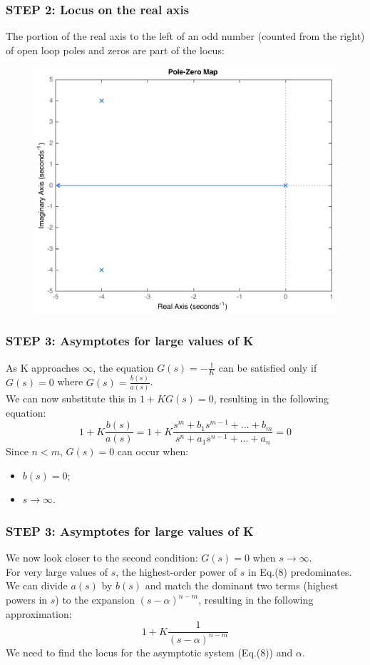 \begin{frame}
\frametitle{STEP 2: Locus on the real axis}
	The portion of the real axis to the left of an odd number (counted from the right) of open loop poles and zeros are part of the locus:
	\begin{exampleblock}{}
		\begin{figure}
			\centering
			\includegraphics[width=0.6\linewidth]{how_to_draw_ex2}
		\end{figure}
	\end{exampleblock}
\end{frame}

\begin{frame}
\frametitle{STEP 3: Asymptotes for large values of K}
\justify
	As K approaches $\infty$, the equation $G(s) = -\frac{1}{K}$ can be satisfied only if $G(s) = 0$ where $G(s) = \frac{b(s)}{a(s)}$.\\
	\vspace{1em}
	We can now substitute this in $1 + KG(s) = 0$, resulting in the following equation:
	\begin{equation}
	1 + K\frac{b(s)}{a(s)} = 1 + K\frac{s^m + b_1s^{m-1} + ... + b_m}{s^n + a_1s^{n-1} + ... + a_n} = 0
	\end{equation}
	Since $n < m$, $G(s) = 0$ can occur when: 
	\begin{itemize}
		\item $b(s) = 0$;
		\item $s \rightarrow \infty$.
	\end{itemize}
\end{frame}

\begin{frame}
\frametitle{STEP 3: Asymptotes for large values of K}
\justify
	We now look closer to the second condition: $G(s) = 0$ when $s \rightarrow \infty$.\\
	\vspace{1em}
	For very large values of $s$, the highest-order power of $s$ in Eq.(8) predominates. We can divide $a(s)$ by $b(s)$ and match the dominant two terms (highest powers in $s$) to the expansion $(s-\alpha)^{n-m}$, resulting in the following approximation:
	\begin{equation}
		1 + K\frac{1}{(s-\alpha)^{n-m}}
	\end{equation}
	We need to find the locus for the asymptotic system (Eq.(8)) and $\alpha$.
\end{frame}

